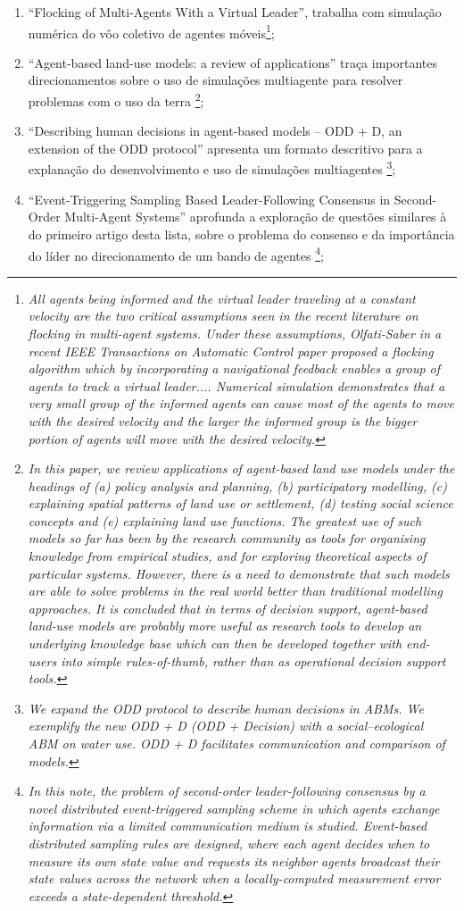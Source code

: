 \begin{enumerate}
    \item ``Flocking of Multi-Agents With a Virtual Leader'', trabalha com simulação numérica do vôo coletivo de agentes móveis\footnote{\textit{All agents being informed and the virtual leader traveling at a constant velocity are the two critical assumptions seen in the recent literature on flocking in multi-agent systems. Under these assumptions, Olfati-Saber in a recent IEEE Transactions on Automatic Control paper proposed a flocking algorithm which by incorporating a navigational feedback enables a group of agents to track a virtual leader.... Numerical simulation demonstrates that a very small group of the informed agents can cause most of the agents to move with the desired velocity and the larger the informed group is the bigger portion of agents will move with the desired velocity. }};
    \item ``Agent-based land-use models: a review of applications'' traça importantes direcionamentos sobre o uso de simulações multiagente para resolver problemas com o uso da terra \footnote{\textit{In this paper, we review applications of agent-based land use models under the headings of (a) policy analysis and planning, (b) participatory modelling, (c) explaining spatial patterns of land use or settlement, (d) testing social science concepts and (e) explaining land use functions. The greatest use of such models so far has been by the research community as tools for organising knowledge from empirical studies, and for exploring theoretical aspects of particular systems. However, there is a need to demonstrate that such models are able to solve problems in the real world better than traditional modelling approaches. It is concluded that in terms of decision support, agent-based land-use models are probably more useful as research tools to develop an underlying knowledge base which can then be developed together with end-users into simple rules-of-thumb, rather than as operational decision support tools.}};
    \item ``Describing human decisions in agent-based models – ODD + D, an extension of the ODD protocol'' apresenta um formato descritivo para a explanação do desenvolvimento e uso de simulações multiagentes \footnote{\textit{We expand the ODD protocol to describe human decisions in ABMs.
We exemplify the new ODD + D (ODD + Decision) with a social–ecological ABM on water use.
ODD + D facilitates communication and comparison of models.}};
\item ``Event-Triggering Sampling Based Leader-Following Consensus in Second-Order Multi-Agent Systems'' aprofunda a exploração de questões similares à do primeiro artigo desta lista, sobre o problema do consenso e da importância do líder no direcionamento de um bando de agentes \footnote{\textit{In this note, the problem of second-order leader-following consensus by a novel distributed event-triggered sampling scheme in which agents exchange information via a limited communication medium is studied. Event-based distributed sampling rules are designed, where each agent decides when to measure its own state value and requests its neighbor agents broadcast their state values across the network when a locally-computed measurement error exceeds a state-dependent threshold. }};

\end{enumerate}

